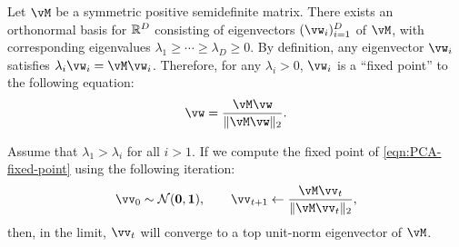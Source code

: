 \documentclass[\toplevelprefix/book-main.tex]{subfiles}
\begin{document}
Let \(\vM\) be a symmetric positive semidefinite matrix. There exists an orthonormal basis for \(\mathbb{R}^{D}\) consisting of eigenvectors \((\vw_{i})_{i = 1}^{D}\) of \(\vM\), with corresponding eigenvalues \(\lambda_{1} \geq \cdots \geq \lambda_{D} \geq 0\). By definition, any eigenvector $\vw_i$ satisfies $\lambda_i \vw_i = \vM \vw_i$. Therefore, for any $\lambda_i > 0$, $\vw_i$ is a   ``fixed point'' to the following equation:
\begin{equation}
    \vw = \frac{\vM\vw}{\norm{\vM\vw}_{2}}.
    \label{eqn:PCA-fixed-point}
\end{equation}

\begin{theorem}
Assume that \(\lambda_{1} > \lambda_{i}\) for all \(i > 1\). If we compute the fixed point of  \eqref{eqn:PCA-fixed-point} using the following iteration:
\begin{equation}\label{eq:power_iteration}
    \vv_{0} \sim \dNorm(\vzero, \vone), \qquad \vv_{t + 1} \gets \frac{\vM\vv_{t}}{\norm{\vM\vv_{t}}_{2}},
\end{equation}
then, in the limit, \(\vv_{t}\) will converge to a top unit-norm eigenvector of \(\vM\).
\end{theorem}
\end{document}
